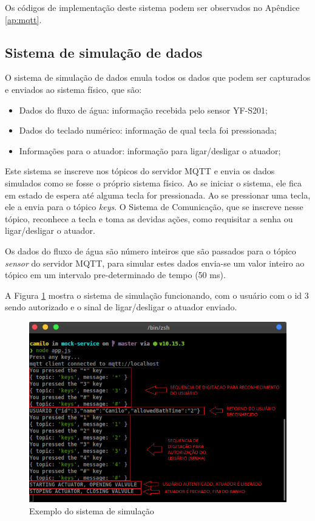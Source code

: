 Os códigos de implementação deste sistema podem ser observados no Apêndice \ref{ap:mqtt}.

\subsection{Sistema de simulação de dados}

O sistema de simulação de dados emula todos os dados que podem ser capturados e enviados ao sistema físico, que são:

\begin{itemize}
	\item Dados do fluxo de água: informação recebida pelo sensor YF-S201;
	\item Dados do teclado numérico: informação de qual tecla foi pressionada;
	\item Informações para o atuador: informação para ligar/desligar o atuador;
\end{itemize}

Este sistema se inscreve nos tópicos do servidor MQTT e envia os dados simulados como se fosse o próprio sistema físico. Ao se iniciar o sistema, ele fica em estado de espera até alguma tecla for pressionada. Ao se pressionar uma tecla, ele a envia para o tópico \textit{keys}. O Sistema de Comunicação, que se inscreve nesse tópico, reconhece a tecla e toma as devidas ações, como requisitar a senha ou ligar/desligar o atuador.

Os dados do fluxo de água são número inteiros que são passados para o tópico \textit{sensor} do servidor MQTT, para simular estes dados envia-se um valor inteiro ao tópico em um intervalo pre-determinado de tempo (50 ms).

A Figura \ref{fig:mockservice} mostra o sistema de simulação funcionando, com o usuário com o id 3 sendo autorizado e o sinal de ligar/desligar o atuador enviado.

\begin{figure}[htbp]
	\centering
	\includegraphics[width=0.6\linewidth]{figuras/mockservice.png}
	\caption{Exemplo do sistema de simulação}
	\label{fig:mockservice}
\end{figure}


